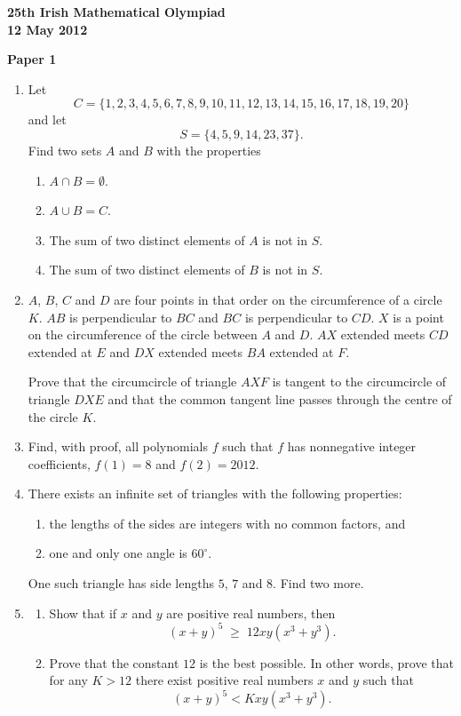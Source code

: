\documentclass[12pt]{article}
\begin{document}
\begin{center}
{\large\bfseries 25th Irish Mathematical Olympiad\\12 May 2012}
\end{center}
\bigskip\noindent\textbf{Paper 1}\bigskip
\begin{enumerate}
\item Let
\[
C = \{1,2,3,4,5,6,7,8,9,10,11,12,13,14,15,16,17,18,19,20\}
\]
and let
\[
S = \{4,5,9,14,23,37\}.
\]
Find two sets $A$ and $B$ with the properties
\begin{enumerate}
\item $A \cap B = \emptyset$.
\item $A \cup B = C$.
\item The sum of two distinct elements of $A$ is not in $S$.
\item The sum of two distinct elements of $B$ is not in $S$.
\end{enumerate}

\item $A$, $B$, $C$ and $D$ are four points in that order on the circumference of a circle $K$. $AB$ is perpendicular to $BC$ and $BC$ is perpendicular to $CD$. $X$ is a point on the circumference of the circle between $A$ and $D$. $AX$ extended meets $CD$ extended at $E$ and $DX$ extended meets $BA$ extended at $F$.

Prove that the circumcircle of triangle $AXF$ is tangent to the circumcircle of triangle $DXE$ and that the common tangent line passes through the centre of the circle $K$.

\item Find, with proof, all polynomials $f$ such that $f$ has nonnegative integer coefficients, $f(1) = 8$ and $f(2) = 2012$.

\item There exists an infinite set of triangles with the following properties:
\begin{enumerate}
\item the lengths of the sides are integers with no common factors, and
\item one and only one angle is $60^\circ$.
\end{enumerate}
One such triangle has side lengths $5$, $7$ and $8$. Find two more.

\item
\begin{enumerate}
\item Show that if $x$ and $y$ are positive real numbers, then
\[
(x+y)^5 \;\ge\; 12xy(x^3+y^3).
\]

\item Prove that the constant $12$ is the best possible. In other words, prove that for any $K > 12$ there exist positive real numbers $x$ and $y$ such that
\[
(x+y)^5 < Kxy(x^3+y^3).
\]
\end{enumerate}
\end{enumerate}
\end{document}
